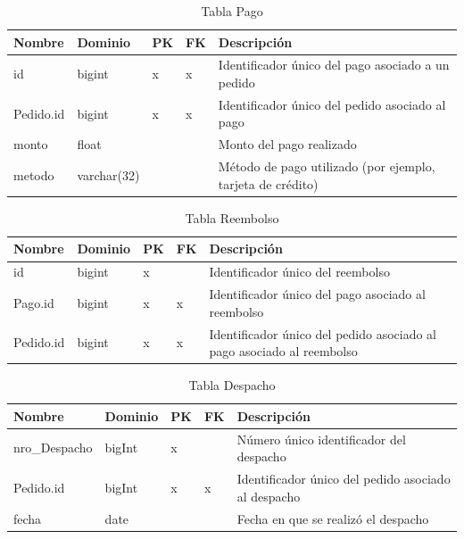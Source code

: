 \documentclass[10pt, a4paper,openany]{report}
\begin{document}
\begin{table}[h]
	\centering
	\begin{tabular}{|l|p{1.5cm}|p{0.5cm}|p{0.5cm}|p{3cm}|}
		\hline
		\textbf{Nombre} & \textbf{Dominio} & \textbf{PK} & \textbf{FK} & \textbf{Descripción}                                       \\
		\hline
		id              & bigint           & x           & x           & Identificador único del pago asociado a un pedido          \\
		\hline
		Pedido.id       & bigint           & x            & x           & Identificador único del pedido asociado al pago            \\
		\hline
		monto           & float            &             &             & Monto del pago realizado                                   \\
		\hline
		metodo          & varchar(32)      &             &             & Método de pago utilizado (por ejemplo, tarjeta de crédito) \\
		\hline
	\end{tabular}
	\caption{Tabla Pago}
\end{table}

\begin{table}[h]
	\centering
	\begin{tabular}{|l|p{1.5cm}|p{0.5cm}|p{0.5cm}|p{3cm}|}
		\hline
		\textbf{Nombre} & \textbf{Dominio} & \textbf{PK} & \textbf{FK} & \textbf{Descripción}                                                  \\
		\hline
		id              & bigint           & x           &             & Identificador único del reembolso                                     \\
		\hline
		Pago.id         & bigint           & x            & x           & Identificador único del pago asociado al reembolso                    \\
		\hline
		Pedido.id       & bigint           & x            & x           & Identificador único del pedido asociado al pago asociado al reembolso \\
		\hline
	\end{tabular}
	\caption{Tabla Reembolso}
\end{table}

\begin{table}[h]
	\centering
	\begin{tabular}{|l|p{1.5cm}|p{0.5cm}|p{0.5cm}|p{3cm}|}
		\hline
		\textbf{Nombre} & \textbf{Dominio} & \textbf{PK} & \textbf{FK} & \textbf{Descripción}                                \\
		\hline
		nro\_Despacho   & bigInt           & x         &  & Número único identificador del despacho             \\
		\hline
		Pedido.id       & bigInt           &     x       & x& Identificador único del pedido asociado al despacho \\
		\hline
		fecha           & date             &           &  & Fecha en que se realizó el despacho                 \\
		\hline
	\end{tabular}
	\caption{Tabla Despacho}
\end{table}
\end{document}
